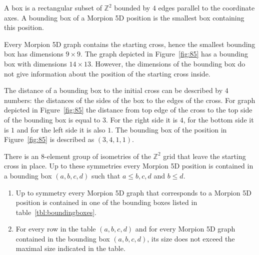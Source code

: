 \begin{definition}
A box is a rectangular subset of ${\mathbb Z}^2$ bounded by $4$ edges parallel to the coordinate axes. A bounding box of a Morpion 5D position is the smallest box
containing this position. %
\end{definition}

Every Morpion 5D graph contains the starting cross, hence the smallest bounding box has dimensions $9 \times 9$.
The graph depicted in Figure~\ref{fig:85} has a bounding box with dimensions $14 \times 13$.
However, the dimensions of the bounding box do not give information about the position of the starting cross inside. %

\begin{notation*}
The distance of a bounding box to the initial cross can be described by $4$ numbers: the distances of the sides of the box to the edges of the cross. 
For graph depicted in Figure~\ref{fig:85} the distance from top edge of the cross to the top side of the bounding box is equal to $3$. For the right side it is $4$, for the bottom side it is $1$ and for the left side it is also $1$. 
The bounding box of the position in Figure~\ref{fig:85} is described as $(3,4,1,1)$.
\end{notation*}
  
There is an $8$-element group of isometries of the $\mathbb{Z}^2$ grid that leave the starting cross in place.
Up to these symmetries every Morpion 5D position is contained in a bounding box $(a,b,c,d)$ such that
  $a \leq b,c,d$ and $b \leq d$. 
\begin{theorem}
\begin{enumerate}
\item Up to symmetry every Morpion 5D graph that corresponds to a Morpion 5D position
    is contained in one of the bounding boxes listed in table~\ref{tbl:boundingboxes}.
\item For every row in the table $(a,b,c,d)$ and for every Morpion 5D graph contained in the bounding box  $(a,b,c,d)$,
its size does not exceed the maximal size indicated in the table.
\end{enumerate} 
\label{thm:boxes}
\end{theorem}

